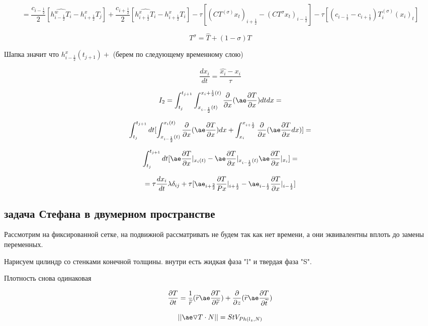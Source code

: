 \documentclass[12pt, a4paper]{article}
\begin{document}
\[ = \frac{c_{i-\frac{1}{2}}}{2} [ \hat{ h_{i-\frac{1}{2}}^w T_i} - h^x_{i+\frac{1}{2}} T_j] + \frac{c_{i+\frac{1}{2}}}{2} [\hat{h^x_{i+\frac{1}{2}}T_i} - h^x_{i+\frac{1}{2}} T_i] - \tau [{(CT^(\sigma) x_t)}_{i+\frac{1}{2}} - {(CT^{\sigma} x_t)}_{i-\frac{1}{2}}] - \tau [(c_{i-\frac{1}{2}} - c_{i+\frac{1}{2}}) T^{(\sigma)}_i(x_i)_t] \]

\[ T^{\sigma} = \hat{T} + (1-\sigma)T \]

Шапка значит что $ h^x_{i-\frac{1}{2}}(t_{j+1}) +  $ (берем по следующему временному слою)

\[ \frac{dx_i}{dt} = \frac{\hat{x_i} - x_i}{\tau} \]

\[ I_2 = \int_{t_j}^{t_{j+1}} \int_{x_{i-\frac{1}{2}}(t)}^{x_i+\frac{1}{2}(t)} \frac{\partial }{\partial x} (\ae \frac{\partial T}{\partial x}) dt dx =  \]

\[ \int_{t_j}^{t_{j+1}} dt [\int_{x_{i-\frac{1}{2}}(t)}^{x_i(t)} \frac{\partial }{\partial x}(\ae \frac{\partial T}{\partial x}) dx + \int_{x_i}^{x_{i+\frac{1}{2}}} \frac{\partial }{\partial x} (\ae\frac{\partial T}{\partial x} dx)] = \]

\[ \int_{t_{j}}^{t_{j+1}} dt [ \ae \frac{\partial T}{\partial x} |_{x_i(t)} - \ae \frac{\partial T}{\partial x}|_{x_{i-\frac{1}{2}}(t)} \ae \frac{\partial T}{\partial x}|_{x_i}] =  \]

\[ = \tau \frac{dx_i}{dt} \lambda \delta_{ij} + \tau [\ae_{i+\frac{2}{2}} \frac{\partial T}{Px}|_{i+\frac{1}{2}} - \ae_{{i-\frac{1}{2}}} \frac{\partial T}{\partial x}|_{i-\frac{1}{2}}] \]

\subsection{задача Стефана в двумерном пространстве}

Рассмотрим на фиксированной сетке, на подвижной рассматривать не будем так как нет времени, а они эквивалентны вплоть до замены переменных.

Нарисуем цилиндр со стенками конечной толщины.  внутри есть жидкая фаза "l" и твердая фаза "S".

Плотность снова одинаковая

\[ \frac{\partial T}{\partial t} =\frac{1 }{\widetilde{r}} (\widetilde{r} \ae \frac{\partial T}{\partial \widetilde{r}}) + \frac{\partial }{\partial z}(\widetilde{r} \ae \frac{\partial T}{\partial \widetilde{t}}) \]

\[ {||\ae \triangledown T \cdot N ||} = S t V_{{Ph}(l_z, N)} \]
\end{document}

